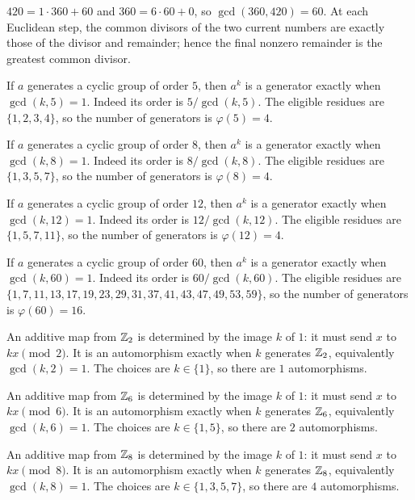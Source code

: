 $420=1\cdot360+60$ and $360=6\cdot60+0$, so $\gcd(360,420)=60$. At each Euclidean step, the common divisors of the two current numbers are exactly those of the divisor and remainder; hence the final nonzero remainder is the greatest common divisor.


If $a$ generates a cyclic group of order $5$, then $a^k$ is a generator exactly when $\gcd(k,5)=1$. Indeed its order is $5/\gcd(k,5)$. The eligible residues are $\{1,2,3,4\}$, so the number of generators is $\varphi(5)=4$.


If $a$ generates a cyclic group of order $8$, then $a^k$ is a generator exactly when $\gcd(k,8)=1$. Indeed its order is $8/\gcd(k,8)$. The eligible residues are $\{1,3,5,7\}$, so the number of generators is $\varphi(8)=4$.


If $a$ generates a cyclic group of order $12$, then $a^k$ is a generator exactly when $\gcd(k,12)=1$. Indeed its order is $12/\gcd(k,12)$. The eligible residues are $\{1,5,7,11\}$, so the number of generators is $\varphi(12)=4$.


If $a$ generates a cyclic group of order $60$, then $a^k$ is a generator exactly when $\gcd(k,60)=1$. Indeed its order is $60/\gcd(k,60)$. The eligible residues are $\{1,7,11,13,17,19,23,29,31,37,41,43,47,49,53,59\}$, so the number of generators is $\varphi(60)=16$.


An additive map from $\mathbb{Z}_2$ is determined by the image $k$ of $1$: it must send $x$ to $kx\pmod{2}$. It is an automorphism exactly when $k$ generates $\mathbb{Z}_2$, equivalently $\gcd(k,2)=1$. The choices are $k\in\{1\}$, so there are $1$ automorphisms.


An additive map from $\mathbb{Z}_6$ is determined by the image $k$ of $1$: it must send $x$ to $kx\pmod{6}$. It is an automorphism exactly when $k$ generates $\mathbb{Z}_6$, equivalently $\gcd(k,6)=1$. The choices are $k\in\{1,5\}$, so there are $2$ automorphisms.


An additive map from $\mathbb{Z}_8$ is determined by the image $k$ of $1$: it must send $x$ to $kx\pmod{8}$. It is an automorphism exactly when $k$ generates $\mathbb{Z}_8$, equivalently $\gcd(k,8)=1$. The choices are $k\in\{1,3,5,7\}$, so there are $4$ automorphisms.

